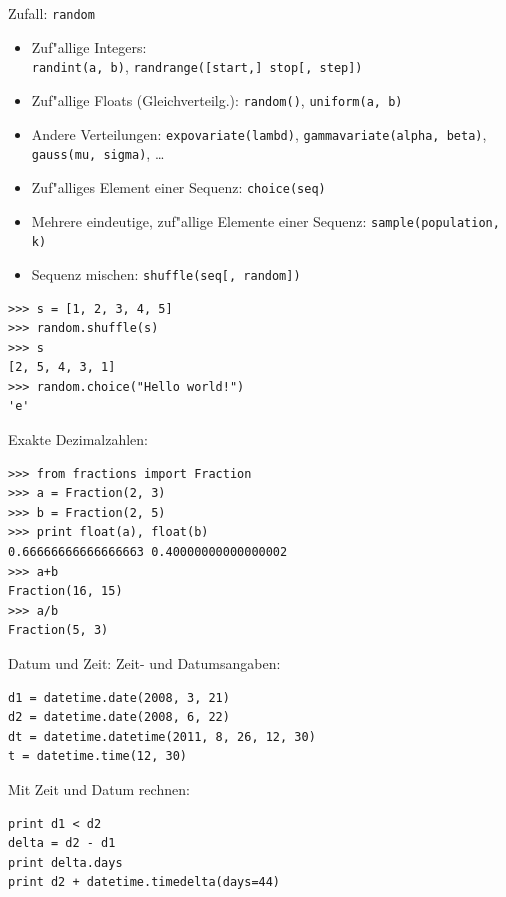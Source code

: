 \begin{frame}[fragile]{Zufall: \texttt{random}}
\begin{itemize}
\item Zuf"allige Integers: \\ \texttt{randint(a, b)},  \texttt{randrange([start,] stop[, step])}
\item Zuf"allige Floats (Gleichverteilg.): \texttt{random()}, \texttt{uniform(a, b)}
\item Andere Verteilungen: \texttt{expovariate(lambd)}, \texttt{gammavariate(alpha, beta)}, \texttt{gauss(mu, sigma)}, \dots
\item Zuf"alliges Element einer Sequenz: \texttt{choice(seq)}
\item Mehrere eindeutige, zuf"allige Elemente einer Sequenz: \texttt{sample(population, k)}
\item Sequenz mischen: \texttt{shuffle(seq[, random])}
\end{itemize}
\begin{lstlisting}[style=Python]
>>> s = [1, 2, 3, 4, 5]
>>> random.shuffle(s)
>>> s
[2, 5, 4, 3, 1]
>>> random.choice("Hello world!")
'e'
\end{lstlisting}
\end{frame}


\begin{frame}[fragile]{Exakte Dezimalzahlen:}

\begin{lstlisting}
>>> from fractions import Fraction
>>> a = Fraction(2, 3)
>>> b = Fraction(2, 5)
>>> print float(a), float(b)
0.66666666666666663 0.40000000000000002
>>> a+b
Fraction(16, 15)
>>> a/b
Fraction(5, 3)
\end{lstlisting}
\end{frame}


\begin{frame}[fragile]{Datum und Zeit: }
Zeit- und Datumsangaben:
\begin{lstlisting}
d1 = datetime.date(2008, 3, 21)  
d2 = datetime.date(2008, 6, 22)
dt = datetime.datetime(2011, 8, 26, 12, 30)
t = datetime.time(12, 30)
\end{lstlisting}
Mit Zeit und Datum rechnen:
\begin{lstlisting}
print d1 < d2
delta = d2 - d1
print delta.days
print d2 + datetime.timedelta(days=44)
\end{lstlisting}
\end{frame}

